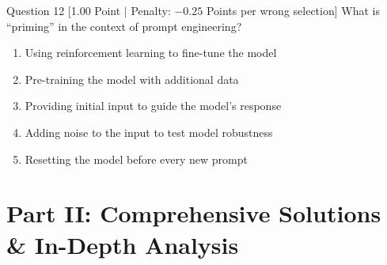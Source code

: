 \documentclass[11pt,a4paper]{article}
\begin{document}
\begin{questionbox}{Question 12 \hfill [1.00 Point $\vert$ Penalty: $-0.25$ Points per wrong selection]}
What is ``priming'' in the context of prompt engineering?
\begin{enumerate}[label=\alph*.,leftmargin=2em]
    \item Using reinforcement learning to fine-tune the model
    \item Pre-training the model with additional data
    \item Providing initial input to guide the model's response
    \item Adding noise to the input to test model robustness
    \item Resetting the model before every new prompt
\end{enumerate}
\end{questionbox}

\newpage
\section{Part II: Comprehensive Solutions \& In-Depth Analysis}
\end{document}
